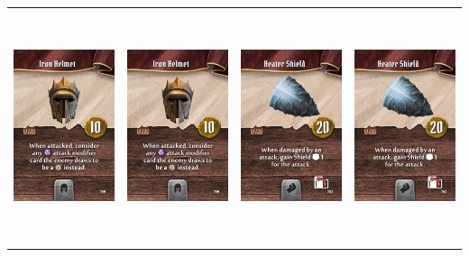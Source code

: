 \documentclass{minimal}
\begin{document}
{\begin{longtable}{llll}
\includegraphics[width=44mm,height=68mm]{./1-14/gh-007-iron-helmet.png} &
\includegraphics[width=44mm,height=68mm]{./1-14/gh-007-iron-helmet.png} &
\includegraphics[width=44mm,height=68mm]{./1-14/gh-008-heater-shield.png} &
\includegraphics[width=44mm,height=68mm]{./1-14/gh-008-heater-shield.png}\\ 

\end{longtable}}
\end{document}
